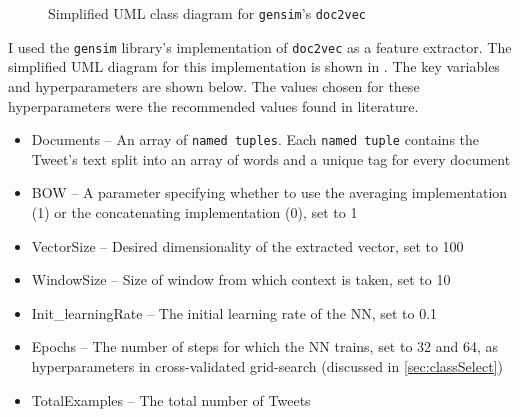 \documentclass[12pt,a4paper,twoside,openright]{report}
\begin{document}
\begin{figure}[H]
\centering
{}
\caption{Simplified UML class diagram for \texttt{gensim}'s \texttt{doc2vec}}
\label{fig:UMLd2v}
\end{figure}

I used the \texttt{gensim} library's implementation of \texttt{doc2vec} as a feature extractor.
The simplified UML diagram for this implementation is shown in . The key
variables and hyperparameters are shown below. The values chosen for these hyperparameters were the recommended values
found in literature.

\begin{itemize}
\item
Documents -- An array of \texttt{named tuples}.
Each \texttt{named tuple} contains the Tweet's text split into an array of words
and a unique tag for every document

\item
BOW -- A parameter specifying whether to use the averaging implementation (1) or the
concatenating implementation (0), set to 1

\item
VectorSize -- Desired dimensionality of the extracted vector, set to 100

\item
WindowSize -- Size of window from which context is taken, set to 10

\item
Init\_learningRate -- The initial learning rate of the NN, set to 0.1

\item
Epochs -- The number of steps for which the NN trains, set to 32 and 64, as hyperparameters
in cross-validated grid-search (discussed in \cref{sec:classSelect})

\item
TotalExamples -- The total number of Tweets
\end{itemize}
\end{document}
